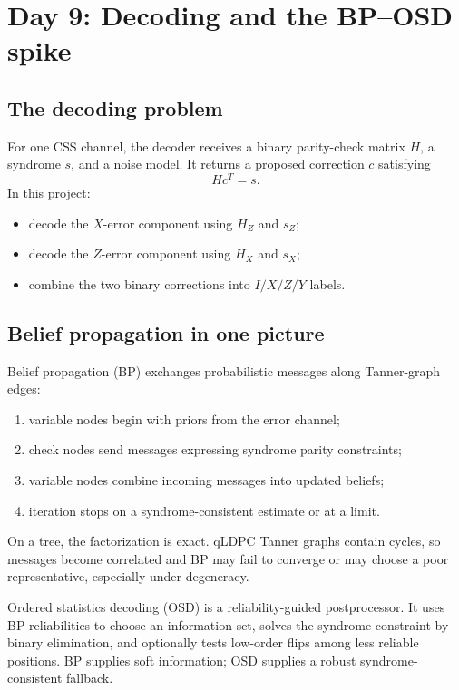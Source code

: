 \documentclass[11pt]{article}
\begin{document}
\section{Day 9: Decoding and the BP--OSD spike}

\subsection{The decoding problem}

For one CSS channel, the decoder receives a binary parity-check matrix \(H\), a syndrome \(s\), and
a noise model. It returns a proposed correction \(c\) satisfying
\[
Hc^T=s.
\]
In this project:
\begin{itemize}
  \item decode the \(X\)-error component using \(H_Z\) and \(s_Z\);
  \item decode the \(Z\)-error component using \(H_X\) and \(s_X\);
  \item combine the two binary corrections into \(I/X/Z/Y\) labels.
\end{itemize}

\subsection{Belief propagation in one picture}

Belief propagation (BP) exchanges probabilistic messages along Tanner-graph edges:
\begin{enumerate}
  \item variable nodes begin with priors from the error channel;
  \item check nodes send messages expressing syndrome parity constraints;
  \item variable nodes combine incoming messages into updated beliefs;
  \item iteration stops on a syndrome-consistent estimate or at a limit.
\end{enumerate}
On a tree, the factorization is exact. qLDPC Tanner graphs contain cycles, so messages become
correlated and BP may fail to converge or may choose a poor representative, especially under
degeneracy.

Ordered statistics decoding (OSD) is a reliability-guided postprocessor. It uses BP reliabilities to
choose an information set, solves the syndrome constraint by binary elimination, and optionally tests
low-order flips among less reliable positions. BP supplies soft information; OSD supplies a robust
syndrome-consistent fallback.
\end{document}
